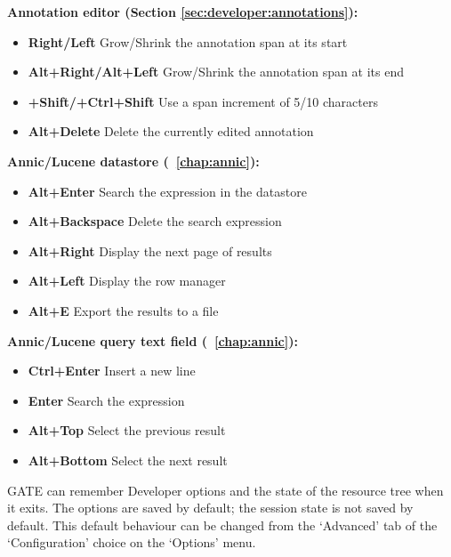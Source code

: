 {\bf Annotation editor (Section \ref{sec:developer:annotations}):}

\begin{itemize}
\item {\bf Right/Left} Grow/Shrink the annotation span at its start
\item {\bf Alt+Right/Alt+Left} Grow/Shrink the annotation span at its end
\item {\bf +Shift/+Ctrl+Shift} Use a span increment of 5/10 characters
\item {\bf Alt+Delete} Delete the currently edited annotation
\end{itemize}

{\bf Annic/Lucene datastore (\Chapthing~\ref{chap:annic}):}

\begin{itemize}
\item {\bf Alt+Enter} Search the expression in the datastore
\item {\bf Alt+Backspace} Delete the search expression
\item {\bf Alt+Right} Display the next page of results
\item {\bf Alt+Left} Display the row manager
\item {\bf Alt+E} Export the results to a file
\end{itemize}

{\bf Annic/Lucene query text field (\Chapthing~\ref{chap:annic}):}

\begin{itemize}
\item {\bf Ctrl+Enter} Insert a new line
\item {\bf Enter} Search the expression
\item {\bf Alt+Top} Select the previous result
\item {\bf Alt+Bottom} Select the next result
\end{itemize}




GATE can remember Developer options and the state of the resource tree when it
exits. The options are saved by default; the session state is not saved by
default. This default behaviour can be changed from the `Advanced' tab of
the `Configuration' choice on the `Options' menu.

